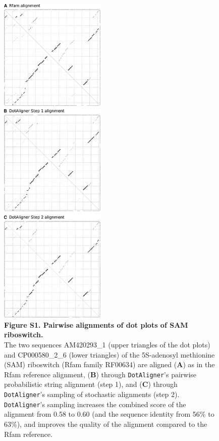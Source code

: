 \documentclass{bmcart}
\newcommand\dotaligner{\texttt{DotAligner}}
\begin{document}
\begin{figure}
 \includegraphics[width=0.45\textwidth]{SF1}
 \caption*{ \textbf{ Figure S1. Pairwise alignments of dot plots of SAM riboswitch. }\\
 The two sequences AM420293\_1 (upper triangles of the dot plots) and CP000580\_2\_6 (lower triangles) of the 5S-adenosyl methionine (SAM) riboswitch (Rfam family RF00634) are aligned (\textbf{A}) as in the Rfam reference alignment, (\textbf{B}) through \dotaligner's pairwise probabilistic string alignment (step 1), and (\textbf{C}) through \dotaligner's sampling of stochastic alignments (step 2). \dotaligner's sampling increases the combined score of the alignment from 0.58 to 0.60 (and the sequence identity from 56\% to 63\%), and improves the quality of the alignment compared to the Rfam reference.
}
\end{figure}
\end{document}
